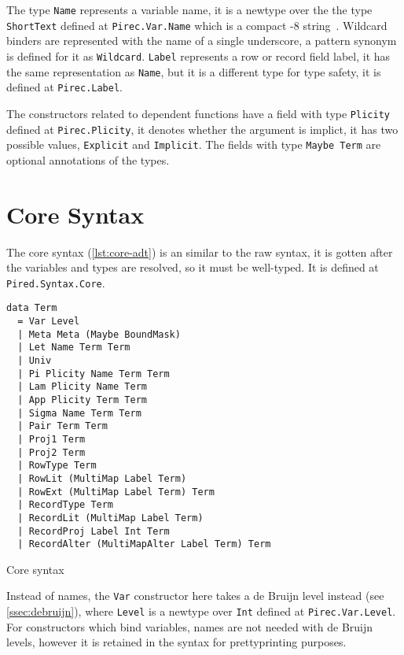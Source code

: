 The type \texttt{Name} represents a variable name, it is a newtype over
the the type \texttt{ShortText} defined at \texttt{Pirec.Var.Name} which
is a compact -8 string~\cite{shorttext}. Wildcard binders are
represented with the name of a single underscore, a pattern synonym is defined
for it as \texttt{Wildcard}. \texttt{Label} represents a row or
record field label, it has the same representation as \texttt{Name}, but
it is a different type for type safety, it is defined at \texttt{Pirec.Label}.

The constructors related to dependent functions have a field with type
\texttt{Plicity} defined at \texttt{Pirec.Plicity}, it denotes whether
the argument is implict, it has two possible values, \texttt{Explicit}
and \texttt{Implicit}. The fields with type \texttt{Maybe Term}
are optional annotations of the types.

\section{Core Syntax}\label{sec:core}

The core syntax (\cref{lst:core-adt}) is an  similar to the raw
syntax, it is gotten after the variables and types are resolved, so it must be
well-typed. It is defined at \texttt{Pired.Syntax.Core}.

\begin{listing}
  \begin{verbatim}
data Term
  = Var Level
  | Meta Meta (Maybe BoundMask)
  | Let Name Term Term
  | Univ
  | Pi Plicity Name Term Term
  | Lam Plicity Name Term
  | App Plicity Term Term
  | Sigma Name Term Term
  | Pair Term Term
  | Proj1 Term
  | Proj2 Term
  | RowType Term
  | RowLit (MultiMap Label Term)
  | RowExt (MultiMap Label Term) Term
  | RecordType Term
  | RecordLit (MultiMap Label Term)
  | RecordProj Label Int Term
  | RecordAlter (MultiMapAlter Label Term) Term
  \end{verbatim}
  \caption{Core syntax }\label{lst:core-adt}
\end{listing}

Instead of names, the \texttt{Var} constructor here takes a de Bruijn
level instead (see \cref{ssec:debruijn}), where \texttt{Level} is a
newtype over \texttt{Int} defined at \texttt{Pirec.Var.Level}. For
constructors which bind variables, names are not needed with de Bruijn levels,
however it is retained in the syntax for prettyprinting purposes.

